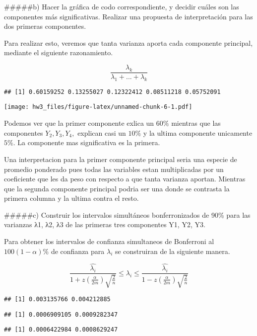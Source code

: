 \documentclass[]{article}
\begin{document}
\#\#\#\#\#b) Hacer la gráfica de codo correspondiente, y decidir cuáles
son las componentes más significativas. Realizar una propuesta de
interpretación para las dos primeras componentes.

Para realizar esto, veremos que tanta varianza aporta cada componente
principal, mediante el siguiente razonamiento.

\[\frac{\lambda_{k}}{\lambda_{1} + ... + \lambda_{k}}\]

\begin{verbatim}
## [1] 0.60159252 0.13255027 0.12322412 0.08511218 0.05752091
\end{verbatim}

\texttt{[image: hw3\_files/figure-latex/unnamed-chunk-6-1.pdf]}

Podemos ver que la primer componente exlica un \(60\%\) mientras que las
componentes \(Y_{2},Y_{3},Y_{4},\) explican casi un \(10\%\) y la ultima
componente unicamente \(5\%\). La componente mas significativa es la
primera.

Una interpretacion para la primer componente principal seria una especie
de promedio ponderado pues todas las variables estan multiplicadas por
un coeficiente que les da peso con respecto a que tanta varianza
aportan. Mientras que la segunda componente principal podria ser una
donde se contrasta la primera columna y la ultima contra el resto.

\#\#\#\#\#c) Construir los intervalos simultáneos bonferronizados de
90\% para las varianzas λ1, λ2, λ3 de las primeras tres componentes Y1,
Y2, Y3.

Para obtener los intervalos de confianza simultaneos de Bonferroni al
\(100(1-\alpha)\%\) de confianza para \(\lambda_{i}\) se construiran de
la siguiente manera.

\[\frac{\hat{\lambda_{i}}}{1 + z(\frac{\alpha}{2m})\sqrt{\frac{2}{n}}}\le \lambda_{i} \le \frac{\hat{\lambda_{i}}}{1 - z(\frac{\alpha}{2m})\sqrt{\frac{2}{n}}} \]

\begin{verbatim}
## [1] 0.003135766 0.004212885
\end{verbatim}

\begin{verbatim}
## [1] 0.0006909105 0.0009282347
\end{verbatim}

\begin{verbatim}
## [1] 0.0006422984 0.0008629247
\end{verbatim}
\end{document}
